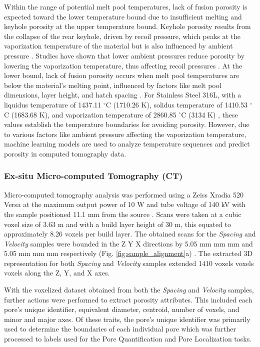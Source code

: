 Within the range of potential melt pool temperatures, lack of fusion porosity is
expected toward the lower temperature bound due to insufficient melting and
keyhole porosity at the upper temperature bound. Keyhole porosity results from
the collapse of the rear keyhole, driven by recoil pressure, which peaks at the
vaporization temperature of the material but is also influenced by ambient
pressure \cite{wang_mechanism_2022}. Studies have shown that lower ambient
pressures reduce porosity by lowering the vaporization temperature, thus
affecting recoil pressures \cite{zhang_microstructure_2013, zhou_study_2018,
jiang_mitigation_2020}. At the lower bound, lack of fusion porosity occurs when
melt pool temperatures are below the material's melting point, influenced by
factors like melt pool dimensions, layer height, and hatch spacing
\cite{tang_prediction_2017}. For Stainless Steel 316L, with a liquidus
temperature of 1437.11 $^{\circ}$C (1710.26 K), solidus temperature of 1410.53
$^{\circ}$C (1683.68 K), and vaporization temperature of 2860.85 $^{\circ}$C
(3134 K) \cite{miyata_inverse_2021}, these values establish the temperature
boundaries for avoiding porosity. However, due to various factors like ambient
pressure affecting the vaporization temperature, machine learning models are
used to analyze temperature sequences and predict porosity in computed
tomography data.

\subsubsection{Ex-situ Micro-computed Tomography (CT)}
Micro-computed tomography analysis was performed using a Zeiss Xradia 520 Versa
at the maximum output power of 10 W and tube voltage of 140 kV with the sample
positioned 11.1 mm from the source \cite{arnhart_-situ_2022}. Scans were taken
at a cubic voxel size of 3.63 \textmu m and with a build layer height of 30
\textmu m, this equated to approximately 8.26 voxels per build layer. The
obtained scans for the \textit{Spacing} and \textit{Velocity} samples were
bounded in the Z \texttimes\;Y \texttimes\;X directions by 5.05 mm
\texttimes{} mm \texttimes{} mm and 5.05 mm \texttimes{} mm
\texttimes{} mm respectively (Fig. \ref{fig:sample_alignment}a)
\cite{arnhart_-situ_2022}. The extracted 3D representation for both
\textit{Spacing} and \textit{Velocity} samples extended 1410 voxels
\texttimes{} voxels \texttimes{} voxels along the Z, Y, and X axes.

With the voxelized dataset obtained from both the \textit{Spacing} and
\textit{Velocity} samples, further actions were performed to extract porosity
attributes. This included each pore's unique identifier, equivalent
diameter, centroid, number of voxels, and minor and major axes. Of these traits,
the pore's unique identifier was primarily used to determine the boundaries of
each individual pore which was further processed to labels used for the Pore
Quantification and Pore Localization tasks.

